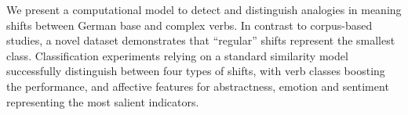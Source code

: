 We present a computational model to detect and distinguish analogies in meaning shifts between German base and complex verbs. In contrast to corpus-based studies, a novel dataset demonstrates that ``regular'' shifts represent the smallest class. Classification experiments relying on a standard similarity model successfully distinguish between four types of shifts, with verb classes boosting the performance, and affective features for abstractness, emotion and sentiment representing the most salient indicators.
